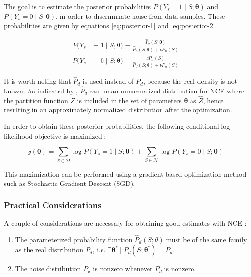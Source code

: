 The goal is to estimate the posterior probabilities $P(Y_{s} = 1 \mid S;\boldsymbol{\theta})$ and $P(Y_{s} = 0 \mid S;\boldsymbol{\theta})$, in order to discriminate noise from data samples. These probabilities are given by equations \eqref{eq:posterior-1} and \eqref{eq:posterior-2}.

\begin{align}
  P(Y_{s} &= 1 \mid S;\boldsymbol{\theta}) = \frac{\hat{P}_{d}(S;\boldsymbol{\theta})}{\hat{P}_{d}(S;\boldsymbol{\theta}) + \nu P_{n}(S)}
  \label{eq:posterior-1} \\
  P(Y_{s} &= 0 \mid S;\boldsymbol{\theta}) = \frac{\nu P_{n}(S)}{\hat{P}_{d}(S;\boldsymbol{\theta}) + \nu P_{n}(S)}
  \label{eq:posterior-2}
\end{align}

It is worth noting that $\hat{P}_{d}$ is used instead of $P_{d}$, because the real density is not known. As indicated by \citet{Gutmann12NCE}, $\hat{P}_{d}$ can be an unnormalized distribution for NCE where the partition function $Z$ is included in the set of parameters $\boldsymbol{\theta}$ as $\hat{Z}$, hence resulting in an approximately normalized distribution after the optimization.

In order to obtain these posterior probabilities, the following conditional log-likelihood objective is maximized \citep{Gutmann12NCE}:

\begin{equation}
\label{eq:log-likelihood}
g(\boldsymbol{\theta}) = \sum_{S \in \mathcal{D}}{\log{P(Y_{s} = 1 \mid S;\boldsymbol{\theta})}} + \sum_{S \in \mathcal{N}}{\log{P(Y_{s} = 0 \mid S;\boldsymbol{\theta})}}
\end{equation}

This maximization can be performed using a gradient-based optimization method such as Stochastic Gradient Descent (SGD).

\subsubsection{Practical Considerations}
\label{sec:nce-practical}

A couple of considerations are necessary for obtaining good estimates with NCE \citep{Gutmann12NCE}:

\begin{enumerate}
  \item The parameterized probability function $\hat{P}_{d}(S;\theta)$ must be of the same family as the real distribution $P_{d}$, i.e. $\exists \boldsymbol{\theta}^{*} \mid \hat{P}_{d}(S;\boldsymbol{\theta}^{*}) = P_{d}$.
  \item The noise distribution $P_{n}$ is nonzero whenever $P_{d}$ is nonzero.
\end{enumerate}

